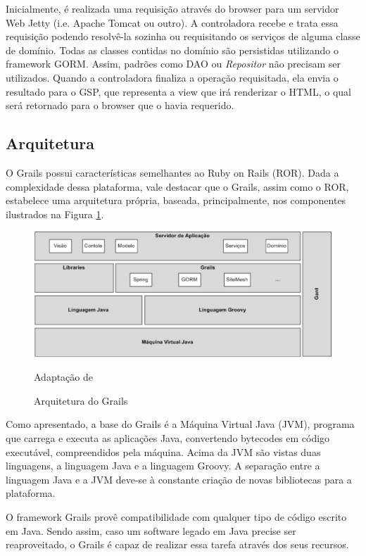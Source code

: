 Inicialmente, é realizada uma requisição através do browser para um servidor Web Jetty (i.e. Apache Tomcat ou outro). A controladora recebe e trata essa requisição podendo resolvê-la sozinha ou requisitando os serviços de
alguma classe de domínio. Todas as classes contidas no domínio são persistidas utilizando o framework GORM. Assim, padrões como DAO ou \textit{Repositor} não precisam ser utilizados. Quando a controladora finaliza a operação requisitada, ela envia o resultado para o GSP, que representa a view que irá renderizar o HTML, o qual será retornado para o browser que o havia requerido.

\subsection{Arquitetura}

O Grails possui características semelhantes ao Ruby on Rails (ROR). Dada a complexidade dessa plataforma, vale destacar que o Grails, assim como o ROR, estabelece uma arquitetura própria, baseada, principalmente, nos componentes ilustrados na Figura \ref{arquitetura-grails}. 

\graphicspath{{figuras/}}
\begin{figure}[H]
\centering
\includegraphics[width=1.0\textwidth]{arquitetura-grails}
\caption{Arquitetura do Grails}{Adaptação de \cite{juddbeginning2008}} 
\label{arquitetura-grails}
\end{figure}

Como apresentado, a base do Grails é a Máquina Virtual Java (JVM), programa que carrega e executa as aplicações Java, convertendo bytecodes em código executável, compreendidos pela máquina. Acima da JVM são vistas duas linguagens, a linguagem Java e a linguagem Groovy. A separação entre a linguagem Java e a JVM deve-se à constante criação de novas bibliotecas para a plataforma.

O framework Grails provê compatibilidade com qualquer tipo de código escrito em Java. Sendo assim, caso um software legado em Java precise ser reaproveitado, o Grails é capaz de realizar essa tarefa através dos seus recursos. 

